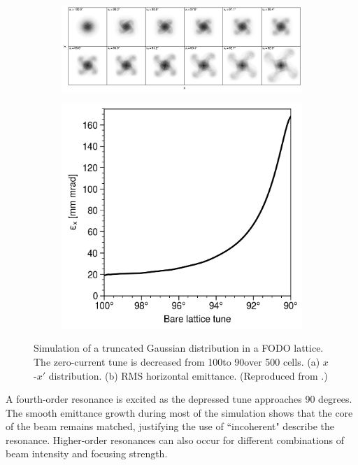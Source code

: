 \begin{figure}[!p]
    \centering
    \vspace*{2cm}
    \begin{subfigure}{\textwidth}
        \includegraphics[width=\textwidth]{Images/chapter1/incoherent_resonance_fourth_order.png}
        \label{fig:incoherent_instability_a}
        \caption{}
    \end{subfigure}
    \vfill
    \vspace*{1cm}
    \vfill
    \begin{subfigure}{0.5\textwidth}
        \includegraphics[width=\textwidth]{Images/chapter1/incoherent_resonance_fourth_order_emittance.png}
        \label{fig:incoherent_instability_b}
        \caption{}
    \end{subfigure}
    \caption{Simulation of a truncated Gaussian distribution in a FODO lattice. The zero-current tune is decreased from 100\degree to 90\degree over 500 cells. (a) $x$-$x'$ distribution. (b) RMS horizontal emittance. (Reproduced from \cite{Hofmann2017Book}.)}
    \label{fig:incoherent_instability}
    \vspace*{2cm}
\end{figure}
%
A fourth-order resonance is excited as the depressed tune approaches 90 degrees. The smooth emittance growth during most of the simulation shows that the core of the beam remains matched, justifying the use of ``incoherent" describe the resonance. Higher-order resonances can also occur for different combinations of beam intensity and focusing strength.





